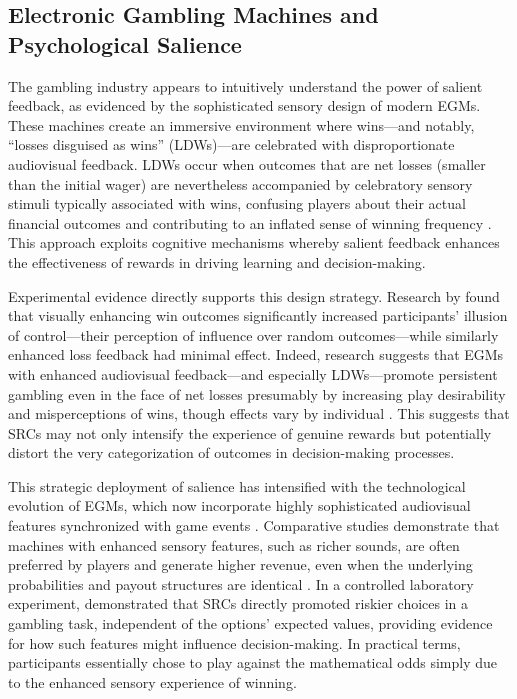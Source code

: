 \subsection{Electronic Gambling Machines and Psychological Salience}

The gambling industry appears to intuitively understand the power of salient feedback, as evidenced by the sophisticated sensory design of modern EGMs. These machines create an immersive environment where wins—and notably, ``losses disguised as wins'' (LDWs)—are celebrated with disproportionate audiovisual feedback. LDWs occur when outcomes that are net losses (smaller than the initial wager) are nevertheless accompanied by celebratory sensory stimuli typically associated with wins, confusing players about their actual financial outcomes and contributing to an inflated sense of winning frequency \citep{dixon2010}. This approach exploits cognitive mechanisms whereby salient feedback enhances the effectiveness of rewards in driving learning and decision-making.

Experimental evidence directly supports this design strategy. Research by \citet{mereu2010} found that visually enhancing win outcomes significantly increased participants' illusion of control—their perception of influence over random outcomes—while similarly enhanced loss feedback had minimal effect. Indeed, research suggests that EGMs with enhanced audiovisual feedback—and especially LDWs—promote persistent gambling even in the face of net losses presumably by increasing play desirability and misperceptions of wins, though effects vary by individual \citep{dixon2014, graydon2018, myles2023}. This suggests that SRCs may not only intensify the experience of genuine rewards but potentially distort the very categorization of outcomes in decision-making processes.

This strategic deployment of salience has intensified with the technological evolution of EGMs, which now incorporate highly sophisticated audiovisual features synchronized with game events \citep{schull2014}. Comparative studies demonstrate that machines with enhanced sensory features, such as richer sounds, are often preferred by players and generate higher revenue, even when the underlying probabilities and payout structures are identical \citep{dixon2014, graydon2018}. In a controlled laboratory experiment, \citet{cherkasova2018} demonstrated that SRCs directly promoted riskier choices in a gambling task, independent of the options' expected values, providing evidence for how such features might influence decision-making. In practical terms, participants essentially chose to play against the mathematical odds simply due to the enhanced sensory experience of winning.

